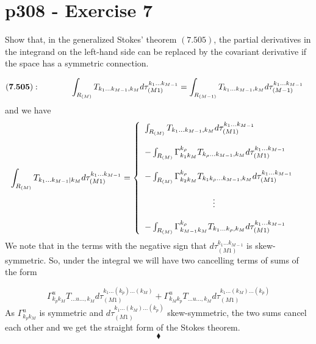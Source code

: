 \section{p308 - Exercise 7}
\begin{tcolorbox}
Show that, in the generalized Stokes' theorem $\mathbf{(7.505)}$, the partial derivatives in the integrand on the left-hand side can be replaced by the covariant derivative if the space has a symmetric connection.
\end{tcolorbox}
\begin{align*}
\mathbf{(7.505):}\quad\quad\quad\quad \int_{R_{(M)}} T_{k_1\dots k_{M-1},k_M}d\tau_{(M1)}^{k_1\dots k_{M-1}}&= \int_{R_{(M-1)}} T_{k_1\dots k_{M-1},k_M}d\tau_{(M-1)}^{k_1\dots k_{M-1}}
\end{align*}
and we have 
\begin{align*}
\int_{R_{(M)}} T_{k_1\dots k_{M-1}|k_M}d\tau_{(M1)}^{k_1\dots k_{M-1}}&= \left\{\begin{array}{l}
\int_{R_{(M)}} T_{k_1\dots k_{M-1},k_M}d\tau_{(M1)}^{k_1\dots k_{M-1}}\\\\
-\int_{R_{(M)}} \Gamma^{k_{\rho}}_{k_1 k_M}T_{k_{\rho}\dots k_{M-1},k_M}d\tau_{(M1)}^{k_1\dots k_{M-1}}\\\\
-\int_{R_{(M)}} \Gamma^{k_{\rho}}_{k_2 k_M}T_{k_1 k_{\rho}\dots k_{M-1},k_M}d\tau_{(M1)}^{k_1\dots k_{M-1}}\\\\
\quad\quad\quad\quad \quad\quad\quad\quad \vdots\\\\
-\int_{R_{(M)}} \Gamma^{k_{\rho}}_{k_{M-1} k_M}T_{k_1\dots k_{\rho},k_M}d\tau_{(M1)}^{k_1\dots k_{M-1}}
\end{array}\right.
\end{align*}
We note that in the terms with the negative sign that $d\tau_{(M1)}^{k_1\dots k_{M-1}}$ is skew-symmetric. So, under the integral we will have two cancelling terms of sums of the form 

$$ \Gamma^{u}_{k_p k_M}T_{\dots u \dots ,k_M}d\tau_{(M1)}^{k_1\dots (k_p)\dots (k_{M})}+\Gamma^{u}_{k_M k_p }T_{\dots u \dots ,k_M}d\tau_{(M1)}^{k_1\dots (k_{M})\dots (k_p)}$$
As $\Gamma^{u}_{k_p k_M}$ is symmetric and  $d\tau_{(M1)}^{k_1\dots (k_{M})\dots (k_p)}$ skew-symmetric, the two sums cancel each other and we get the straight form of the Stokes theorem.
$$\blacklozenge$$\\
\newpage


